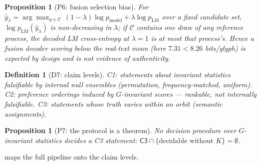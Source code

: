 \documentclass[10pt,twocolumn]{article}
\newtheorem{proposition}[theorem]{Proposition}
\newtheorem{definition}[theorem]{Definition}
\newcommand{\Cone}{\textsf{C1}}
\newcommand{\Ctwo}{\textsf{C2}}
\newcommand{\Cthree}{\textsf{C3}}
\begin{document}
\begin{proposition}[P6: fusion selection bias]
\label{prop:P6-body}
For $\hat y_\lambda=\arg\max_{y\in\mathcal C}\,(1-\lambda)\log
p_{\mathrm{model}}+\lambda\log p_{\mathrm{LM}}$ over a fixed candidate
set, $\log p_{\mathrm{LM}}(\hat y_\lambda)$ is non-decreasing in
$\lambda$; if $\mathcal C$ contains one draw of any reference process,
the decoded LM cross-entropy at $\lambda=1$ is at most that process's.
Hence a fusion decoder scoring below the real-text mean
(here $7.31<8.26$ bits/glyph) is expected \emph{by design} and is not
evidence of authenticity.
\end{proposition}

\begin{definition}[D7: claim levels]
\label{def:claims-body}
\Cone{}: statements about invariant statistics falsifiable by internal
null ensembles (permutation, frequency-matched, uniform).
\Ctwo{}: preference orderings induced by $G$-invariant scores ---
rankable, not internally falsifiable.
\Cthree{}: statements whose truth varies within an orbit (semantic
assignments).
\end{definition}

\begin{proposition}[P7: the protocol is a theorem]
\label{prop:P7-body}
No decision procedure over $G$-invariant statistics decides a \Cthree{}
statement: $\Cthree\cap\{\text{decidable without }K\}=\emptyset$.
\end{proposition}

 maps the full pipeline onto the claim levels.
\end{document}

